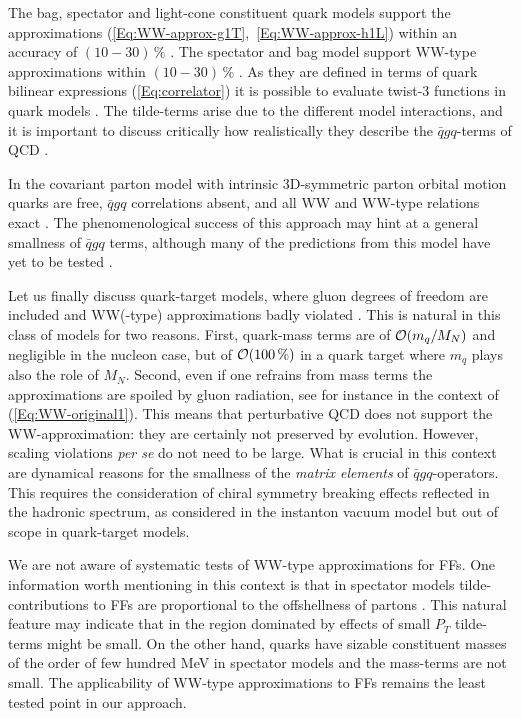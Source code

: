 \documentclass[a4paper,11pt]{article}
\begin{document}
The bag, spectator and light-cone constituent quark models support 
the approximations (\ref{Eq:WW-approx-g1T},~\ref{Eq:WW-approx-h1L}) 
within an accuracy of $(10-30)\,\%$ 
\cite{Avakian:2010br,Jakob:1997wg,Lorce:2011dv,Pasquini:2008ax}.
The spectator and bag model support WW-type approximations 
within $(10-30)\,\%$ \cite{Avakian:2010br}. 
As they are defined in terms of quark bilinear expressions 
(\ref{Eq:correlator}) it is possible to evaluate twist-3 functions
in quark models \cite{Jaffe:1991ra}. The tilde-terms arise due to
the different model interactions, and it is important to discuss
critically how realistically they describe the $\bar{q}gq$-terms
of QCD \cite{Lorce:2014hxa,Lorce:2016ugb}.

In the covariant parton model with intrinsic 3D-symmetric parton 
orbital motion \cite{Zavada:1996kp}  quarks are free, $\bar qgq$ 
correlations absent, and all WW and WW-type relations exact
\cite{Efremov:2010mt,Efremov:2009ze}.
The phenomenological success of this approach \cite{Zavada:1996kp} may 
hint at a general smallness of $\bar qgq$ terms, although many of the 
predictions from this model have yet to be tested \cite{Efremov:2010mt}.

Let us finally discuss quark-target models, 
where gluon degrees of freedom are included and WW(-type)
approximations badly violated
\cite{Kundu:2001pk,Schlegel:2004rg,Meissner:2007rx,Mukherjee:2009uy}.
This is natural in this class of models for two
reasons. First, quark-mass terms are of ${\cal O}(m_q/M_N)$ 
and negligible in the nucleon case, but of ${\cal O}(100\,\%)$
in a quark target where $m_q$ plays also the role of $M_N$. 
Second, even if one refrains from mass terms the approximations are 
spoiled by gluon radiation, see for instance \cite{Harindranath:1997qn} 
in the context of (\ref{Eq:WW-original1}).
This means that perturbative QCD does not support the WW-approximation:
they are certainly not preserved by evolution. However, scaling violations
{\it per se} do not need to be large. What is crucial in this context are 
dynamical reasons for the smallness of the {\sl matrix elements} of
$\bar qgq$-operators. This requires the consideration of chiral symmetry 
breaking effects reflected in the hadronic spectrum, as considered in the
instanton vacuum model \cite{Balla:1997hf,Dressler:1999hc} but 
out of scope in quark-target models.

We are not aware of systematic tests of WW-type approximations for FFs. One 
information worth mentioning in this context is that in spectator models 
\cite{Jakob:1997wg} tilde-contributions to FFs are proportional to the 
offshellness of partons %
\cite{Lorce:2014hxa,Lorce:2016ugb}. This
natural feature may indicate that in the region dominated by effects of
small $P_T$ tilde-terms might be small. On the other hand, quarks have 
sizable constituent masses of the order of few hundred MeV in spectator models 
and the mass-terms are not small. 
The applicability of WW-type approximations to FFs 
remains the least tested point in our approach.
\end{document}
